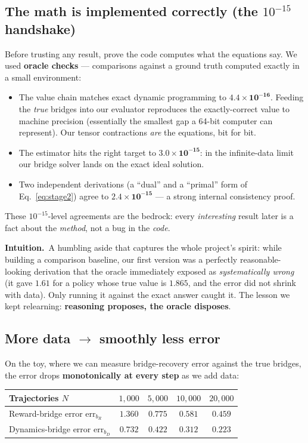 \documentclass[11pt]{article}
\newcommand{\intuition}[1]{\vspace{2pt}\noindent\textbf{Intuition.}\ #1\par\vspace{2pt}}
\begin{document}
\subsection{The math is implemented correctly (the $10^{-15}$ handshake)}
Before trusting any result, prove the code computes what the equations say. We used
\textbf{oracle checks} --- comparisons against a ground truth computed exactly in a
small environment:
\begin{itemize}
  \item The value chain matches exact dynamic programming to $\mathbf{4.4\times
  10^{-16}}$. Feeding the \emph{true} bridges into our evaluator reproduces the
  exactly-correct value to machine precision (essentially the smallest gap a 64-bit
  computer can represent). Our tensor contractions \emph{are} the equations, bit for
  bit.
  \item The estimator hits the right target to $\mathbf{3.0\times10^{-15}}$: in the
  infinite-data limit our bridge solver lands on the exact ideal solution.
  \item Two independent derivations (a ``dual'' and a ``primal'' form of
  Eq.~\eqref{eq:stage2}) agree to $\mathbf{2.4\times10^{-15}}$ --- a strong internal
  consistency proof.
\end{itemize}
These $10^{-15}$-level agreements are the bedrock: every \emph{interesting} result
later is a fact about the \emph{method}, not a bug in the \emph{code}.

\intuition{A humbling aside that captures the whole project's spirit: while building a
comparison baseline, our first version was a perfectly reasonable-looking derivation
that the oracle immediately exposed as \emph{systematically wrong} (it gave $1.61$ for
a policy whose true value is $1.865$, and the error did not shrink with data). Only
running it against the exact answer caught it. The lesson we kept relearning:
\textbf{reasoning proposes, the oracle disposes}.}

\subsection{More data $\rightarrow$ smoothly less error}
On the toy, where we can measure bridge-recovery error against the true bridges, the
error drops \textbf{monotonically at every step} as we add data:

\begin{center}
\begin{tabular}{@{}lcccc@{}}
\toprule
Trajectories $N$ & $1{,}000$ & $5{,}000$ & $10{,}000$ & $20{,}000$\\
\midrule
Reward-bridge error $\mathrm{err}_{b_R}$ & $1.360$ & $0.775$ & $0.581$ & $\mathbf{0.459}$\\
Dynamics-bridge error $\mathrm{err}_{b_D}$ & $0.732$ & $0.422$ & $0.312$ & $\mathbf{0.223}$\\
\bottomrule
\end{tabular}
\end{center}
\end{document}
